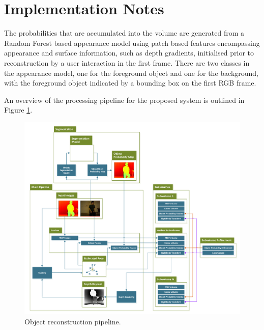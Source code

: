\section{Implementation Notes}
The probabilities that are accumulated into the volume are generated from a Random Forest based appearance model using patch based features encompassing 
appearance and surface information, such as depth gradients, initialised prior to reconstruction by a user interaction in the first frame. There are two 
classes in the appearance model, one for the foreground object and one for the background, with the foreground object indicated by a bounding box on the 
first RGB frame.

An overview of the processing pipeline for the proposed system is outlined in Figure \ref{pipelineDiagram}.
\begin{figure}[!t]
	\centering
	\includegraphics[scale=0.33]{pipeline.pdf}
	\caption{Object reconstruction pipeline.}
	\label{pipelineDiagram}
\end{figure}